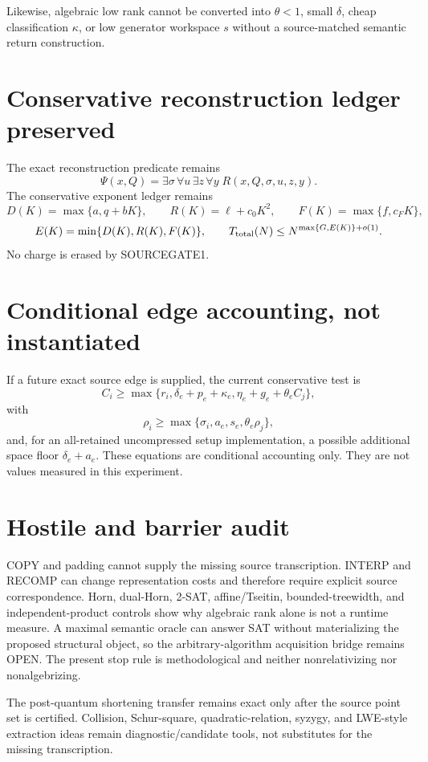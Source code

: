 \documentclass[11pt]{article}
\begin{document}
Likewise, algebraic low rank cannot be converted into \(\theta<1\), small \(\delta\), cheap classification \(\kappa\), or low generator workspace \(s\) without a source-matched semantic return construction.

\section*{Conservative reconstruction ledger preserved}
The exact reconstruction predicate remains
\[
\Psi(x,Q)=\exists\sigma\,\forall u\,\exists z\,\forall y\;R(x,Q,\sigma,u,z,y).
\]
The conservative exponent ledger remains
\[
D(K)=\max\{a,q+bK\},\qquad
R(K)=\ell+c_0K^2,\qquad
F(K)=\max\{f,c_FK\},
\]
\[
E(K)=\min\{D(K),R(K),F(K)\},\qquad
T_{\rm total}(N)\le N^{\max\{G,E(K)\}+o(1)}.
\]
No charge is erased by SOURCEGATE1.

\section*{Conditional edge accounting, not instantiated}
If a future exact source edge is supplied, the current conservative test is
\[
C_i\ge
\max\{r_i,\delta_e+p_e+\kappa_e,\eta_e+g_e+\theta_e C_j\},
\]
with
\[
\rho_i\ge\max\{\sigma_i,a_e,s_e,\theta_e\rho_j\},
\]
and, for an all-retained uncompressed setup implementation, a possible additional space floor \(\delta_e+a_e\). These equations are conditional accounting only. They are not values measured in this experiment.

\section*{Hostile and barrier audit}
COPY and padding cannot supply the missing source transcription. INTERP and RECOMP can change representation costs and therefore require explicit source correspondence. Horn, dual-Horn, 2-SAT, affine/Tseitin, bounded-treewidth, and independent-product controls show why algebraic rank alone is not a runtime measure. A maximal semantic oracle can answer SAT without materializing the proposed structural object, so the arbitrary-algorithm acquisition bridge remains OPEN. The present stop rule is methodological and neither nonrelativizing nor nonalgebrizing.

The post-quantum shortening transfer remains exact only after the source point set is certified. Collision, Schur-square, quadratic-relation, syzygy, and LWE-style extraction ideas remain diagnostic/candidate tools, not substitutes for the missing transcription.
\end{document}
